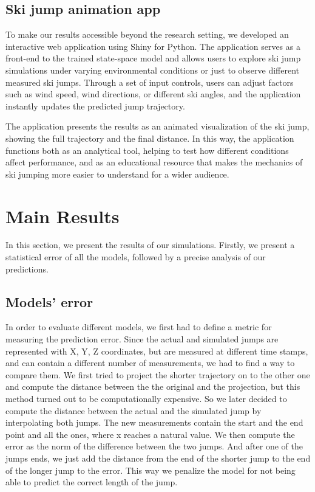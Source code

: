 \documentclass[sigconf,natbib=false, language=english]{acmart}
\begin{document}
\subsection{Ski jump animation app}

To make our results accessible beyond the research setting, we developed an interactive web application using Shiny for Python. The application serves as a front-end to the trained state-space model and allows users to explore ski jump simulations under varying environmental conditions or just to observe different measured ski jumps. Through a set of input controls, users can adjust factors such as wind speed, wind directions, or different ski angles, and the application instantly updates the predicted jump trajectory.

The application presents the results as an animated visualization of the ski jump, showing the full trajectory and the final distance. In this way, the application functions both as an analytical tool, helping to test how different conditions affect performance, and as an educational resource that makes the mechanics of ski jumping more easier to understand for a wider audience.

\section{Main Results}
\label{sec:results}

In this section, we present the results of our simulations. Firstly, we present a statistical error of all the models, followed by a precise analysis of our predictions.



\subsection{Models' error}

In order to evaluate different models, we first had to define a metric for measuring the prediction error.
Since the actual and simulated jumps are represented with X, Y, Z coordinates, but are measured at different time stamps,
and can contain a different number of measurements, we had to find a way to compare them. We first tried to project
the shorter trajectory on to the other one and compute the distance between the the original and the projection, 
but this method turned out to be computationally expensive. So we later decided to compute the distance between 
the actual and the simulated jump by interpolating both jumps. The new measurements contain the start and the end point
and all the ones, where x reaches a natural value. We then compute the error as the norm of the difference between the two jumps.
And after one of the jumps ends, we just add the distance from the end of the shorter jump to the end of the longer jump
to the error. This way we penalize the model for not being able to predict the correct length of the jump.
\end{document}
